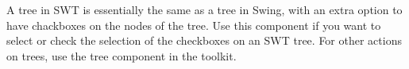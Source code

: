 
A tree in SWT is essentially the same as a tree in Swing, with an extra option to have chackboxes on the nodes of the tree. Use this component if you want to select or check the selection of the checkboxes on an SWT tree. For other actions on trees, use the tree component in the  toolkit. 


